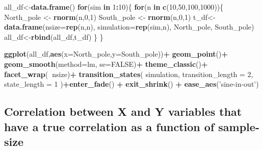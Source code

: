 \documentclass[]{book}
\newenvironment{Shaded}{\begin{snugshade}}{\end{snugshade}}
\newcommand{\ControlFlowTok}[1]{\textcolor[rgb]{0.13,0.29,0.53}{\textbf{#1}}}
\newcommand{\DataTypeTok}[1]{\textcolor[rgb]{0.13,0.29,0.53}{#1}}
\newcommand{\DecValTok}[1]{\textcolor[rgb]{0.00,0.00,0.81}{#1}}
\newcommand{\KeywordTok}[1]{\textcolor[rgb]{0.13,0.29,0.53}{\textbf{#1}}}
\newcommand{\NormalTok}[1]{#1}
\newcommand{\OperatorTok}[1]{\textcolor[rgb]{0.81,0.36,0.00}{\textbf{#1}}}
\newcommand{\OtherTok}[1]{\textcolor[rgb]{0.56,0.35,0.01}{#1}}
\newcommand{\StringTok}[1]{\textcolor[rgb]{0.31,0.60,0.02}{#1}}
\begin{document}
\begin{Shaded}
\begin{Highlighting}[]
\NormalTok{all_df<-}\KeywordTok{data.frame}\NormalTok{()}
\ControlFlowTok{for}\NormalTok{(sim }\ControlFlowTok{in} \DecValTok{1}\OperatorTok{:}\DecValTok{10}\NormalTok{)\{}
  \ControlFlowTok{for}\NormalTok{(n }\ControlFlowTok{in} \KeywordTok{c}\NormalTok{(}\DecValTok{10}\NormalTok{,}\DecValTok{50}\NormalTok{,}\DecValTok{100}\NormalTok{,}\DecValTok{1000}\NormalTok{))\{}
\NormalTok{  North_pole <-}\StringTok{ }\KeywordTok{rnorm}\NormalTok{(n,}\DecValTok{0}\NormalTok{,}\DecValTok{1}\NormalTok{)}
\NormalTok{  South_pole <-}\StringTok{ }\KeywordTok{rnorm}\NormalTok{(n,}\DecValTok{0}\NormalTok{,}\DecValTok{1}\NormalTok{)}
\NormalTok{  t_df<-}\KeywordTok{data.frame}\NormalTok{(}\DataTypeTok{nsize=}\KeywordTok{rep}\NormalTok{(n,n),}
                   \DataTypeTok{simulation=}\KeywordTok{rep}\NormalTok{(sim,n),}
\NormalTok{                                  North_pole,}
\NormalTok{                                  South_pole)}
\NormalTok{  all_df<-}\KeywordTok{rbind}\NormalTok{(all_df,t_df)}
\NormalTok{  \}}
\NormalTok{\}}


\KeywordTok{ggplot}\NormalTok{(all_df,}\KeywordTok{aes}\NormalTok{(}\DataTypeTok{x=}\NormalTok{North_pole,}\DataTypeTok{y=}\NormalTok{South_pole))}\OperatorTok{+}
\StringTok{  }\KeywordTok{geom_point}\NormalTok{()}\OperatorTok{+}
\StringTok{  }\KeywordTok{geom_smooth}\NormalTok{(}\DataTypeTok{method=}\NormalTok{lm, }\DataTypeTok{se=}\OtherTok{FALSE}\NormalTok{)}\OperatorTok{+}
\StringTok{  }\KeywordTok{theme_classic}\NormalTok{()}\OperatorTok{+}
\StringTok{  }\KeywordTok{facet_wrap}\NormalTok{(}\OperatorTok{~}\NormalTok{nsize)}\OperatorTok{+}
\StringTok{  }\KeywordTok{transition_states}\NormalTok{(}
\NormalTok{    simulation,}
    \DataTypeTok{transition_length =} \DecValTok{2}\NormalTok{,}
    \DataTypeTok{state_length =} \DecValTok{1}
\NormalTok{  )}\OperatorTok{+}\KeywordTok{enter_fade}\NormalTok{() }\OperatorTok{+}\StringTok{ }
\StringTok{  }\KeywordTok{exit_shrink}\NormalTok{() }\OperatorTok{+}
\StringTok{  }\KeywordTok{ease_aes}\NormalTok{(}\StringTok{'sine-in-out'}\NormalTok{)}
\end{Highlighting}
\end{Shaded}

\hypertarget{correlation-between-x-and-y-variables-that-have-a-true-correlation-as-a-function-of-sample-size}{%
\subsection{Correlation between X and Y variables that have a true correlation as a function of sample-size}\label{correlation-between-x-and-y-variables-that-have-a-true-correlation-as-a-function-of-sample-size}}
\end{document}

